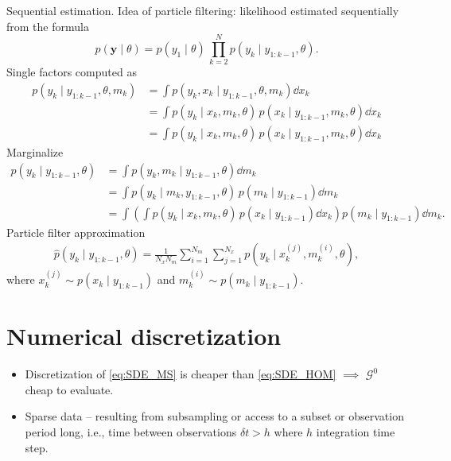 \documentclass[10pt]{article}
\begin{document}
Sequential estimation. Idea of particle filtering: likelihood estimated sequentially from the formula
\begin{equation}
p(\mathbf y \mid \theta) = p(y_1 \mid \theta) \, \prod_{k=2}^{N} p(y_k \mid y_{1:k-1}, \theta). 
\end{equation}
Single factors computed as
\begin{equation}
\begin{aligned}
p(y_k \mid y_{1:k-1}, \theta, m_k) &= \int p(y_k, x_k \mid y_{1:k-1}, \theta, m_k) \dd x_k\\
&= \int p(y_k \mid x_k, m_k, \theta) \, p(x_k \mid y_{1:k-1}, m_k, \theta) \dd x_k \\
&= \int p(y_k \mid x_k, m_k, \theta) \, p(x_k \mid y_{1:k-1}, m_k, \theta) \dd x_k
\end{aligned}
\end{equation}
Marginalize
\begin{equation}
\begin{aligned}
p(y_k \mid y_{1:k-1}, \theta) &= \int p(y_k, m_k \mid y_{1:k-1}, \theta) \dd m_k \\
&= \int p(y_k \mid m_k, y_{1:k-1}, \theta) \, p(m_k \mid y_{1:k-1}) \dd m_k \\
&= \int \left(\int p(y_k \mid x_k, m_k, \theta) \, p(x_k \mid y_{1:k-1}) \dd x_k \right) p(m_k \mid y_{1:k-1}) \dd m_k.
\end{aligned}
\end{equation}
Particle filter approximation
\begin{equation}
\begin{aligned}
\widehat p(y_k \mid y_{1:k-1}, \theta) = \frac{1}{N_x N_m} \sum_{i=1}^{N_m} \sum_{j=1}^{N_x} p(y_k \mid x_k^{(j)}, m_k^{(i)}, \theta),
\end{aligned}
\end{equation}
where $x_k^{(j)} \sim p(x_k \mid y_{1:k-1})$ and $m_k^{(i)} \sim p(m_k \mid y_{1:k-1})$.

\section{Numerical discretization}

\begin{itemize}[label=-]
	\item Discretization of \eqref{eq:SDE_MS} is cheaper than \eqref{eq:SDE_HOM} $\implies$ $\mathcal G^0$ cheap to evaluate.
	\item Sparse data -- resulting from subsampling or access to a subset or observation period long, i.e., time between observations $\delta t > h$ where $h$ integration time step.
\end{itemize}
\end{document}
